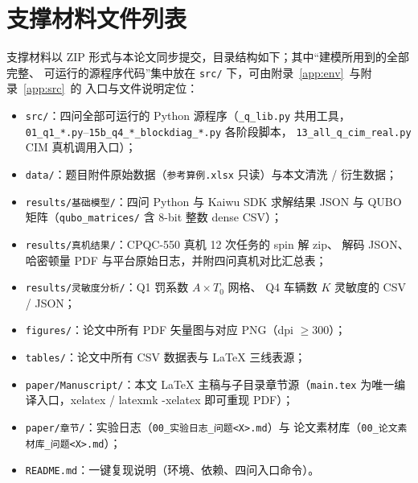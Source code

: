 \documentclass[UTF8,12pt,a4paper]{ctexart}
\begin{document}
\appendix

\section{支撑材料文件列表}
\label{app:files}

支撑材料以 ZIP 形式与本论文同步提交，目录结构如下；其中``建模所用到的全部完整、
可运行的源程序代码''集中放在 \texttt{src/} 下，可由附录~\ref{app:env}~与附录~\ref{app:src}~的
入口与文件说明定位：

\begin{itemize}[leftmargin=2em,itemsep=0.2ex]
  \item \texttt{src/}：四问全部可运行的 Python 源程序（\texttt{\_q\_lib.py} 共用工具，
        \texttt{01\_q1\_*.py}--\texttt{15b\_q4\_*\_blockdiag\_*.py} 各阶段脚本，
        \texttt{13\_all\_q\_cim\_real.py} CIM 真机调用入口）；
  \item \texttt{data/}：题目附件原始数据（\texttt{参考算例.xlsx} 只读）与本文清洗 / 衍生数据；
  \item \texttt{results/基础模型/}：四问 Python 与 Kaiwu SDK 求解结果 JSON
        与 QUBO 矩阵（\texttt{qubo\_matrices/} 含 8-bit 整数 dense CSV）；
  \item \texttt{results/真机结果/}：CPQC-550 真机 12 次任务的 spin 解 zip、
        解码 JSON、哈密顿量 PDF 与平台原始日志，并附四问真机对比汇总表；
  \item \texttt{results/灵敏度分析/}：Q1 罚系数 $A\!\times\!T_0$ 网格、
        Q4 车辆数 $K$ 灵敏度的 CSV / JSON；
  \item \texttt{figures/}：论文中所有 PDF 矢量图与对应 PNG（dpi $\ge 300$）；
  \item \texttt{tables/}：论文中所有 CSV 数据表与 LaTeX 三线表源；
  \item \texttt{paper/Manuscript/}：本文 LaTeX 主稿与子目录章节源（\texttt{main.tex}
        为唯一编译入口，xelatex / latexmk -xelatex 即可重现 PDF）；
  \item \texttt{paper/章节/}：实验日志（\texttt{00\_实验日志\_问题<X>.md}）与
        论文素材库（\texttt{00\_论文素材库\_问题<X>.md}）；
  \item \texttt{README.md}：一键复现说明（环境、依赖、四问入口命令）。
\end{itemize}
\end{document}
